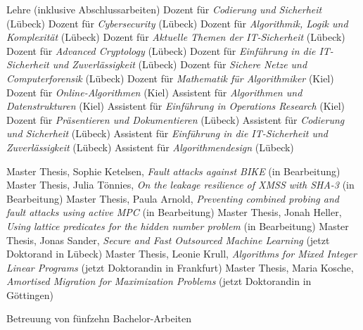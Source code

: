 \begin{rubric}{Lehre (inklusive Abschlussarbeiten)}
\entry*[2022] Dozent für \emph{Codierung und Sicherheit} (Lübeck)
\entry*[2022] Dozent für \emph{Cybersecurity} (Lübeck)
\entry*[2022] Dozent für \emph{Algorithmik, Logik und Komplexität} (Lübeck)
\entry*[2022] Dozent für \emph{Aktuelle Themen der IT-Sicherheit} (Lübeck)
\entry*[2021, 2022] Dozent für \emph{Advanced Cryptology} (Lübeck)
\entry*[2020, 2021] Dozent für \emph{Einführung in die IT-Sicherheit und Zuverlässigkeit} (Lübeck)
\entry*[2020, 2021]  Dozent für \emph{Sichere Netze und Computerforensik} (Lübeck)
\entry*[2018, 2019] Dozent für \emph{Mathematik für Algorithmiker} (Kiel)
\entry*[2018] Dozent für \emph{Online-Algorithmen} (Kiel)
\entry*[2018, 2019] Assistent für \emph{Algorithmen und Datenstrukturen} (Kiel)
\entry*[2018, 2019] Assistent für \emph{Einführung in Operations Research} (Kiel)
\entry*[2015] Dozent für \emph{Präsentieren und Dokumentieren} (Lübeck)
\entry*[2013--2016] Assistent für \emph{Codierung und Sicherheit} (Lübeck)
\entry*[2012--2016] Assistent für \emph{Einführung in die IT-Sicherheit und Zuverlässigkeit} (Lübeck)
\entry*[2012--2016] Assistent für \emph{Algorithmendesign} (Lübeck)


\entry*[2022] Master Thesis, Sophie Ketelsen,  \emph{Fault attacks against BIKE} (in Bearbeitung)
  \entry*[2022] Master Thesis, Julia Tönnies, \emph{On the leakage resilience of XMSS with SHA-3} (in Bearbeitung)
  \entry*[2022] Master Thesis, Paula Arnold, \emph{Preventing combined probing and fault attacks using active MPC} (in Bearbeitung)
  \entry*[2022] Master Thesis, Jonah Heller, \emph{Using lattice predicates for the hidden number problem} (in Bearbeitung)
  \entry*[2021] Master Thesis, Jonas Sander, \emph{Secure and Fast Outsourced Machine Learning} (jetzt Doktorand in Lübeck)
    \entry*[2020] Master Thesis, Leonie Krull, \emph{Algorithms for Mixed Integer Linear Programs} (jetzt Doktorandin in Frankfurt)
\entry*[2019] Master Thesis, Maria Kosche, \emph{Amortised Migration for Maximization Problems}
(jetzt Doktorandin in Göttingen)

\entry*[2015--2022] Betreuung von fünfzehn Bachelor-Arbeiten

    
\end{rubric}
